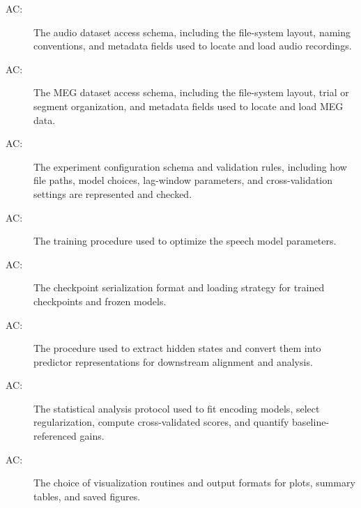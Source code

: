 \documentclass[12pt, titlepage]{article}
\newcounter{acnum}
\newcommand{\actheacnum}{AC\theacnum}
\begin{document}
\begin{description}

\item[ \actheacnum \label{acAudioFormat}:] The audio
dataset access schema, including the file-system layout, naming conventions, and metadata fields used to locate and load audio recordings.

\item[ \actheacnum \label{acMEGFormat}:] The MEG dataset access schema, including the file-system layout, trial or segment organization, and metadata fields used to locate and load MEG data.

\item[ \actheacnum \label{acParams}:] The experiment
configuration schema and validation rules, including how file paths, model
choices, lag-window parameters, and cross-validation settings are represented and checked.

\item[ \actheacnum \label{acTraining}:] The training
procedure used to optimize the speech model parameters.

\item[ \actheacnum \label{acFrozen}:] The checkpoint
serialization format and loading strategy for trained checkpoints and frozen models.

\item[ \actheacnum \label{acRepresentation}:] The
procedure used to extract hidden states and convert them into predictor
representations for downstream alignment and analysis.

\item[ \actheacnum \label{acAnalysis}:] The statistical analysis protocol used to fit encoding models, select regularization, compute cross-validated scores, and quantify baseline-referenced gains.

\item[ \actheacnum \label{acPlot}:] The choice of
visualization routines and output formats for plots, summary tables, and saved figures.
\end{description}



\end{document}
